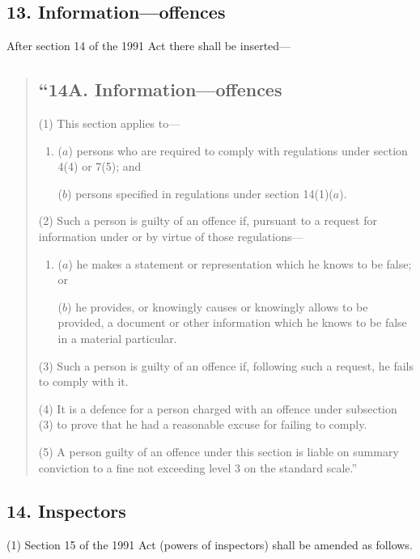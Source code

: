 \documentclass[12pt,a4paper]{article}
\begin{document}
\subsection{13. Information—offences}

After section 14 of the 1991 Act there shall be inserted—
\begin{quotation}
\subsection*{“14A. Information—offences}

(1) This section applies to—
\begin{enumerate}\item[]
($a$) persons who are required to comply with regulations under section 4(4)  or 7(5); and

($b$) persons specified in regulations under section 14(1)($a$).
\end{enumerate}

(2) Such a person is guilty of an offence if, pursuant to a request for information under or by virtue of those regulations—
\begin{enumerate}\item[]
($a$) he makes a statement or representation which he knows to be false; or

($b$) he provides, or knowingly causes or knowingly allows to be provided, a document or other information which he knows to be false in a material particular.
\end{enumerate}

(3) Such a person is guilty of an offence if, following such a request, he fails to comply with it.

(4) It is a defence for a person charged with an offence under subsection (3)  to prove that he had a reasonable excuse for failing to comply.

(5) A person guilty of an offence under this section is liable on summary conviction to a fine not exceeding level 3 on the standard scale.”
\end{quotation}

\subsection{14. Inspectors}

(1) Section 15 of the 1991 Act (powers of inspectors) shall be amended as follows.
\end{document}
